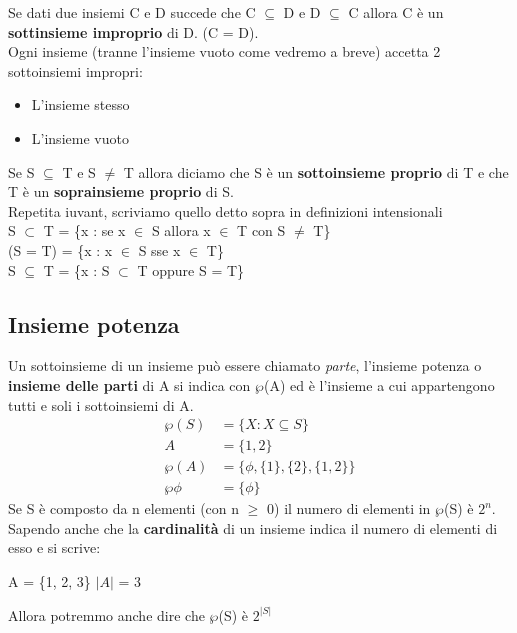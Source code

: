 Se dati due insiemi C e D succede che C $\subseteq$ D e D $\subseteq$ C
allora C è un \textbf{sottinsieme improprio} di D. (C = D).\\
Ogni insieme (tranne l'insieme vuoto come vedremo a breve) accetta 2 sottoinsiemi impropri:
\begin{itemize}
    \item L'insieme stesso
    \item L'insieme vuoto
\end{itemize}
Se S $\subseteq$ T e S $\neq$ T allora diciamo che S è un \textbf{sottoinsieme proprio} di T
e che T è un \textbf{soprainsieme proprio} di S. \\
Repetita iuvant, scriviamo quello detto sopra in definizioni intensionali \\
S $\subset$ T = \{x : se x $\in$ S allora x $\in$ T con S $\neq$ T\} \\
(S = T) = \{x : x $\in$ S sse x $\in$ T\} \\
S $\subseteq$ T = \{x : S $\subset$ T oppure S = T\} \\

\subsection{Insieme potenza}
Un sottoinsieme di un insieme può essere chiamato \textit{parte}, l'insieme potenza
o \textbf{insieme delle parti} di A si indica con $\wp$(A) ed è l'insieme a cui appartengono tutti e soli i sottoinsiemi di A. \\
\begin{align*}
    \wp(S) &= \{X : X \subseteq S\} \\
    A &= \{1, 2\} \\
    \wp(A) &= \{\phi, \{1\}, \{2\}, \{1, 2\}\} \\
    \wp\phi &= \{\phi\}
\end{align*}
Se S è composto da n elementi (con n $\geq$ 0) il numero di elementi in $\wp$(S) è $2^n$.
Sapendo anche che la \textbf{cardinalità} di un insieme indica il numero di elementi di esso e si scrive:
\begin{center}
    A = \{1, 2, 3\} $|A|$ = 3
\end{center}
Allora potremmo anche dire che $\wp$(S) è $2^{|S|}$